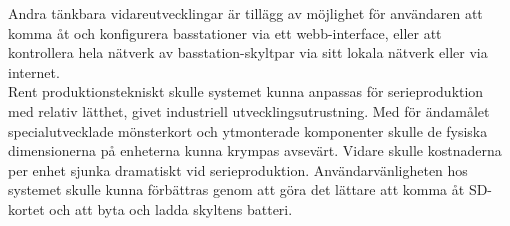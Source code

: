 \documentclass[a4paper,11pt]{article}
\begin{document}
Andra tänkbara vidareutvecklingar är tillägg av möjlighet för användaren att komma åt och konfigurera basstationer via ett webb-interface, eller att kontrollera hela nätverk av basstation-skyltpar via sitt lokala nätverk eller via internet. \\

Rent produktionstekniskt skulle systemet kunna anpassas för serieproduktion med relativ lätthet, givet industriell utvecklingsutrustning. Med för ändamålet specialutvecklade mönsterkort och ytmonterade komponenter skulle de fysiska dimensionerna på enheterna kunna krympas avsevärt. Vidare skulle kostnaderna per enhet sjunka dramatiskt vid serieproduktion. Användarvänligheten hos systemet skulle kunna förbättras genom att göra det lättare att komma åt SD-kortet och att byta och ladda skyltens batteri. 

\pagebreak
\end{document}

